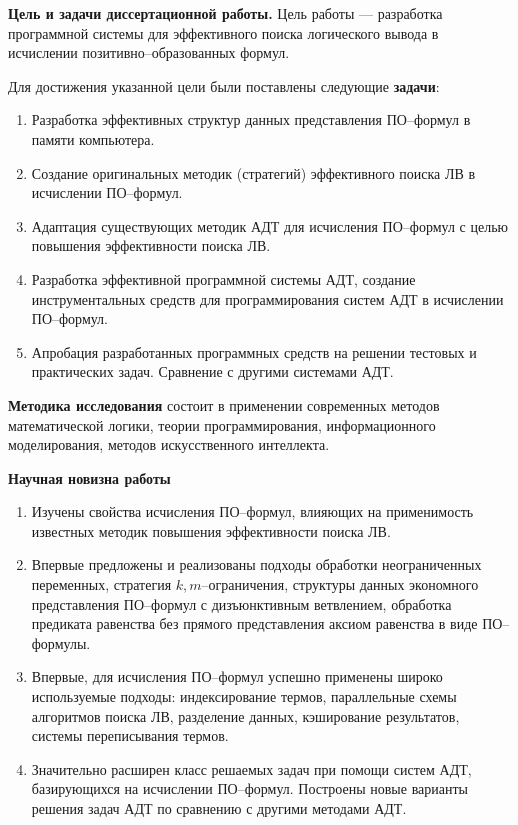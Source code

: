 \documentclass[a4paper]{report}
\begin{document}
\textbf{Цель и задачи диссертационной работы.}
Цель работы --- разработка программной системы для эффективного поиска логического вывода в исчислении позитивно--образованных формул.

Для достижения указанной цели были поставлены следующие \textbf{задачи}:

\begin{enumerate}
\item Разработка эффективных структур данных представления ПО--формул в памяти компьютера.
\item Создание оригинальных методик (стратегий) эффективного поиска ЛВ в исчислении ПО--формул.
\item Адаптация существующих методик АДТ для исчисления ПО--формул с целью повышения эффективности поиска ЛВ.
\item Разработка эффективной программной системы АДТ, создание инструментальных средств для программирования систем АДТ в исчислении ПО--формул.
\item Апробация разработанных программных средств на решении тестовых и практических задач. Сравнение с другими системами АДТ.
\end{enumerate}

\textbf{Методика исследования} состоит в применении современных методов математической логики, теории программирования, информационного моделирования, методов искусственного интеллекта.


\textbf{Научная новизна работы}
\begin{enumerate}
\item Изучены свойства исчисления ПО--формул, влияющих на применимость известных методик повышения эффективности поиска ЛВ.
\item Впервые предложены и реализованы подходы обработки неограниченных переменных, стратегия $k,m$--ограничения, структуры данных экономного представления ПО--формул с дизъюнктивным ветвлением, обработка предиката равенства без прямого представления аксиом равенства в виде ПО--формулы.
\item Впервые, для исчисления ПО--формул успешно применены широко используемые подходы: индексирование термов, параллельные схемы алгоритмов поиска ЛВ, разделение данных, кэширование результатов, системы переписывания термов.
\item Значительно расширен класс решаемых задач при помощи систем АДТ, базирующихся на исчислении ПО--формул. Построены новые варианты решения задач АДТ по сравнению с другими методами АДТ.
\end{enumerate}
\end{document}
